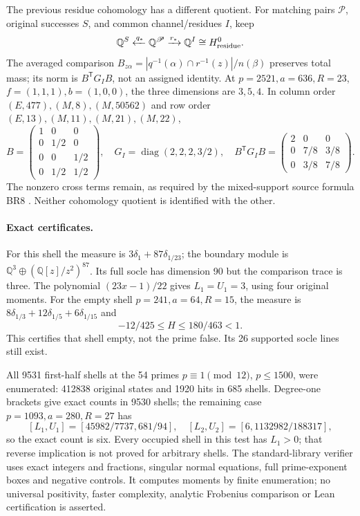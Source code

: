\documentclass[10pt,a4paper]{article}
\begin{document}
The previous residue cohomology has a different quotient. For matching pairs
$\mathscr P$, original successes $S$, and common channel/residues $I$, keep
\[
 \mathbb Q^S\xleftarrow{q_*}\mathbb Q^{\mathscr P}
 \xrightarrow{r_*}\mathbb Q^I\cong H^0_{\rm residue}.
\]
The averaged comparison $B_{z\alpha}=|q^{-1}(\alpha)\cap r^{-1}(z)|/n(\beta)$
preserves total mass; its norm is $B^{\mathsf T}G_I B$, not an assigned identity.
At $p=2521,a=636,R=23$, $f=(1,1,1),b=(1,0,0)$, the three dimensions are
$3,5,4$. In column order $(E,477),(M,8),(M,50562)$ and row order
$(E,13),(M,11),(M,21),(M,22)$,
\[
 B=\begin{pmatrix}1&0&0\\0&1/2&0\\0&0&1/2\\0&1/2&1/2\end{pmatrix},\quad
 G_I=\operatorname{diag}(2,2,2,3/2),\quad
 B^{\mathsf T}G_I B=\begin{pmatrix}2&0&0\\0&7/8&3/8\\0&3/8&7/8\end{pmatrix}.
 \tag{9}
\]
The nonzero cross terms remain, as required by the mixed-support source formula
BR8 \cite{SZ}. Neither cohomology quotient is identified with the other.

\paragraph{Exact certificates.}
For this shell the measure is $3\delta_1+87\delta_{1/23}$; the boundary module
is $\mathbb Q^3\oplus(\mathbb Q[z]/z^2)^{87}$. Its full socle has dimension
90 but the comparison trace is three. The polynomial $(23x-1)/22$ gives
$L_1=U_1=3$, using four original moments.
For the empty shell $p=241,a=64,R=15$, the measure is
$8\delta_{1/3}+12\delta_{1/5}+6\delta_{1/15}$ and
\[
 -12/425\le H\le180/463<1.
\]
This certifies that shell empty, not the prime false. Its 26 supported socle
lines still exist.

All 9531 first-half shells at the 54 primes $p\equiv1\pmod{12}$, $p\le1500$,
were enumerated: 412838 original states and 1920 hits in 685 shells.
Degree-one brackets give exact counts in 9530 shells; the remaining case
$p=1093,a=280,R=27$ has
\[
 [L_1,U_1]=[45982/7737,681/94],\quad
 [L_2,U_2]=[6,1132982/188317],
\]
so the exact count is six. Every occupied shell in this test has $L_1>0$;
that reverse implication is not proved for arbitrary shells. The standard-library
verifier uses exact integers and fractions, singular normal equations,
full prime-exponent boxes and negative controls. It computes moments by
finite enumeration; no universal positivity, faster complexity, analytic
Frobenius comparison or Lean certification is asserted.
\end{document}
